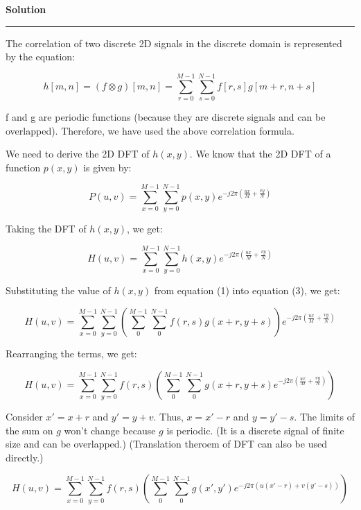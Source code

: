 \documentclass[a4paper]{article}
\newenvironment{solution}[2][]{%
    \begin{mdframed}[linecolor=green!60!black, linewidth=2pt, roundcorner=10pt, backgroundcolor=green!5!white, skipabove=12pt, skipbelow=12pt]%
        \textbf{\large #2} %
        \par\noindent\rule{\textwidth}{0.4pt} %
        \vspace{0.5em} %
}{%
    \end{mdframed}%
}
\begin{document}
\begin{solution}{Solution}
The correlation of two discrete 2D signals in the discrete domain is represented by the equation:

\begin{equation}
    h[m, n] = (f \otimes g)[m, n] = \sum_{r=0}^{M-1} \sum_{s=0}^{N-1} f[r, s]g[m+r, n+s]
\end{equation}


f and g are periodic functions (because they are discrete signals and can be overlapped). Therefore, we have used the above correlation formula.


We need to derive the 2D DFT of $h(x, y)$. We know that the 2D DFT of a function $p(x, y)$ is given by: 

\begin{equation}
    P(u, v) = \sum_{x = 0}^{M-1} \sum_{y = 0}^{N-1} p(x, y) e^{-j2\pi(\frac{ux}{M}+\frac{vy}{N})} 
\end{equation}

Taking the DFT of $h(x, y)$, we get:

\begin{equation}
    H(u, v) = \sum_{x = 0}^{M-1} \sum_{y = 0}^{N-1} h(x, y) e^{-j2\pi(\frac{ux}{M}+\frac{vy}{N})} 
\end{equation}

Substituting the value of $h(x, y)$ from equation (1) into equation (3), we get:

\begin{equation}
    H(u, v) = \sum_{x = 0}^{M-1} \sum_{y = 0}^{N-1} \left( \sum_{0}^{M-1} \sum_{0}^{N-1} f(r, s)g(x+r, y+s)\right) e^{-j2\pi(\frac{ux}{M}+\frac{vy}{N})} 
\end{equation}

Rearranging the terms, we get:

\begin{equation}
    H(u, v) = \sum_{x = 0}^{M-1} \sum_{y = 0}^{N-1} f(r, s)\left( \sum_{0}^{M-1} \sum_{0}^{N-1} g(x+r, y+s) e^{-j2\pi(\frac{ux}{M}+\frac{vy}{N})}\right)  
\end{equation}


Consider $x' = x + r$ and $y' = y + v$. Thus, $x = x' - r$ and $y = y' - s$. The limits of the sum on $g$ won't change because $g$ is periodic. (It is a discrete signal of finite size and can be overlapped.) (Translation theroem of DFT can also be used directly.)

\begin{equation}
    H(u, v) = \sum_{x = 0}^{M-1} \sum_{y = 0}^{N-1} f(r, s)\left( \sum_{0}^{M-1} \sum_{0}^{N-1} g(x', y') e^{-j2\pi(u(x'-r)+v(y'-s))}\right)
\end{equation}


\end{solution}
\end{document}

